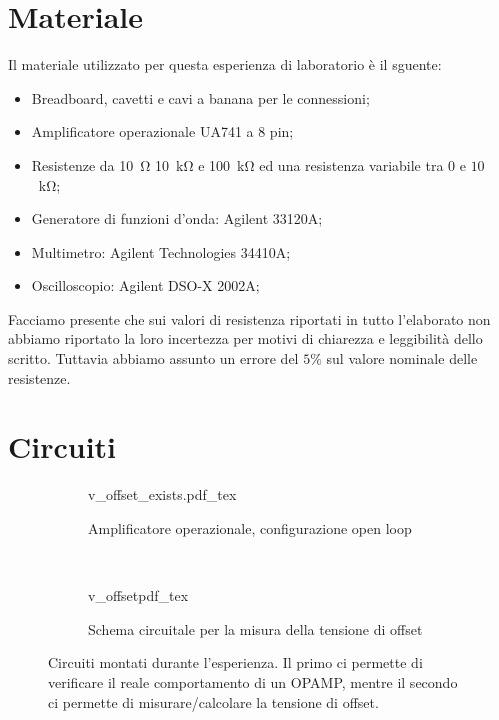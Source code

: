 \section*{Materiale}

Il materiale utilizzato per questa esperienza di laboratorio è il sguente:

\begin{itemize} \itemsep2pt \parskip0pt 
    \item{Breadboard, cavetti e cavi a banana per le connessioni;}
    \item{Amplificatore operazionale UA741 a 8 pin;}
    \item{Resistenze da \SI{10}{\ohm} \SI{10}{\kilo\ohm} e \SI{100}{\kilo\ohm} ed una resistenza variabile tra $0$ e $10$ \SI{}{\kilo\ohm};}
    \item{Generatore di funzioni d'onda: Agilent 33120A;}
    \item{Multimetro: Agilent Technologies 34410A;}
    \item{Oscilloscopio: Agilent DSO-X 2002A;}
\end{itemize}

Facciamo presente che sui valori di resistenza riportati in tutto l'elaborato non abbiamo riportato la loro incertezza per motivi di chiarezza e leggibilità dello scritto. Tuttavia abbiamo assunto un errore del $5\%$ sul valore nominale delle resistenze.

\section*{Circuiti}

\begin{figure}[h]
        \centering
        \begin{subfigure}[b]{0.48\textwidth}
        		\def\svgwidth{\textwidth}
                {v_offset_exists.pdf_tex}
                \caption{Amplificatore operazionale, configurazione open loop}
                \label{fig:open_loop}
        \end{subfigure}
        ~
        \begin{subfigure}[b]{0.48\textwidth}
        		\def\svgwidth{\textwidth}
                {v_offsetpdf_tex}
                \caption{Schema circuitale per la misura della tensione di offset}
                \label{fig:offset}
        \end{subfigure}
        \caption{Circuiti montati durante l'esperienza. Il primo ci permette di verificare il reale comportamento di un OPAMP, mentre il secondo ci permette di misurare/calcolare la tensione di offset.}
        \label{fig:circuits}
\end{figure}
